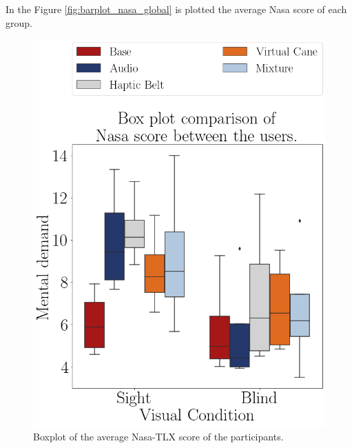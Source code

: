 In the Figure \ref{fig:barplot_nasa_global} is plotted the average Nasa score of each group.

\begin{figure}[!htb]
    \begin{minipage}{.45\linewidth}
        \centering
        \includegraphics[width = \linewidth]{Resultados/Nasa/Figuras/png/boxplot_nasa_avg_scene.png}
        \caption{Boxplot of the average Nasa-TLX score of the participants.}
        \label{fig:boxplot_nasa_scene}
    \end{minipage}
    \begin{minipage}{.1\linewidth}
        \hfill
    \end{minipage}
    \begin{minipage}{.45\linewidth}
        \centering
        \vspace{1.8cm}

\end{minipage}
\end{figure}
